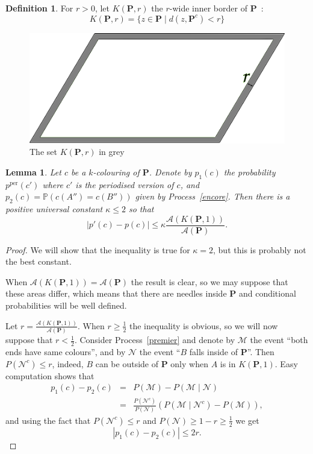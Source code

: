 \documentclass[a4paper,11pt]{article}
\newtheorem{lemma}{Lemma}
\theoremstyle{definition}
\newtheorem{definition}{Definition}
\theoremstyle{remark}
\renewcommand{\Pr}{\mathbb{P}}
\renewcommand{\P}{\mathbf{P}}
\newcommand{\pper}{p^{\mathrm{per}}}
\begin{document}
\begin{definition}
For $r>0$, let $K(\mathbf{P},r)$ the $r$-wide inner border of $\mathbf{P}$~:
\[K(\mathbf{P},r) = \{ z \in \mathbf{P} \mid d(z,\mathbf{P}^c) < r\} \] 
\end{definition}

\begin{figure}[h]
\center
\includegraphics[scale=0.5]{tablefinie.png}
\caption{\label{tablefinie} The set $K(\mathbf{P},r)$ in grey}
\end{figure}

\begin{lemma}
Let $c$ be a $k$-colouring of $\mathbf{P}$. Denote by $p_1(c)$ the probability 
$\pper(c')$ where $c'$ is the periodised version of $c$, and 
$p_2(c) = \Pr(c(A'')=c(B''))$ given by Process~\ref{encore}. Then 
there is a positive universal constant $\kappa \leq 2$ so that 
$$ | p'(c) - p(c)| \leq \kappa \frac{\mathcal{A}(K(\mathbf{P},1))}{\mathcal{A}(\mathbf{P})}.$$
\end{lemma}

\begin{proof}
We will show that the inequality is true for $\kappa =2$, but this is probably 
not the best constant.

When $\mathcal{A}(K(\mathbf{P},1)) = \mathcal{A}(\mathbf{P})$ the result is clear,
so we may suppose that these areas differ, which means that there are needles 
inside $\P$ and conditional probabilities will be well defined.

Let $r = \frac{\mathcal{A}(K(\mathbf{P},1))}{\mathcal{A}(\mathbf{P})}$. When 
$r \geq \frac12$ the inequality is obvious, so we will now suppose that 
$r < \frac12$. Consider Process~\ref{premier} and denote by $\mathcal{M}$ the 
event ``both ends have same colours'', and by $\mathcal{N}$ the event ``$B$ 
falls inside of $\mathbf{P}$''. Then $P(\mathcal{N}^c) \leq r$, indeed, $B$ can 
be outside of $\mathbf{P}$ only
when $A$ is in $K(\mathbf{P},1)$. Easy computation shows that
\begin{eqnarray*}
p_1(c) - p_2(c) & = & P(\mathcal{M}) - P(\mathcal{M} \mid \mathcal{N}) \\
& = & \frac{P(\mathcal{N}^c)}{P(\mathcal{N})} \left( P(\mathcal{M}\mid \mathcal{N}^c) - P(\mathcal{M})\right),
\end{eqnarray*}
and using the fact that $P(\mathcal{N}^c) \leq r$ and 
$P(\mathcal{N}) \geq 1-r \geq \frac12$ we get 
$$ |p_1(c) - p_2(c)| \leq 2r.$$
\end{proof}
\end{document}
